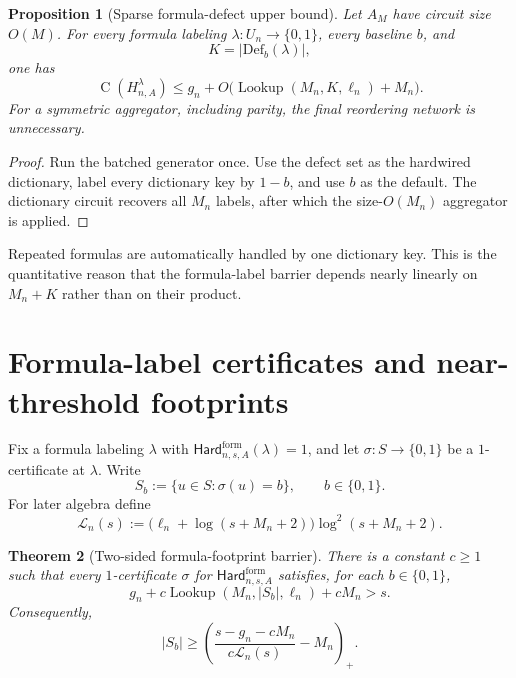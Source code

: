 \documentclass[11pt]{article}
\newtheorem{theorem}{Theorem}[section]
\newtheorem{proposition}[theorem]{Proposition}
\theoremstyle{definition}
\newcommand{\bits}{\{0,1\}}
\newcommand{\Ckt}{\operatorname{C}}
\newcommand{\Lookup}{\operatorname{Lookup}}
\newcommand{\HardF}{\mathsf{Hard}^{\mathrm{form}}}
\newcommand{\pospart}[1]{\left(#1\right)_{+}}
\begin{document}
\begin{proposition}[Sparse formula-defect upper bound]\label{prop:defect}
Let $A_M$ have circuit size $O(M)$.  For every formula labeling $\lambda:U_n\to\bits$, every baseline $b$, and
\[
  K=|\mathrm{Def}_b(\lambda)|,
\]
one has
\begin{equation}\label{eq:defect-upper}
  \Ckt(H_{n,A}^{\lambda})
  \le g_n+O\bigl(\Lookup(M_n,K,\ell_n)+M_n\bigr).
\end{equation}
For a symmetric aggregator, including parity, the final reordering network is unnecessary.
\end{proposition}

\begin{proof}
Run the batched generator once.  Use the defect set as the hardwired dictionary, label every dictionary key by $1-b$, and use $b$ as the default.  The dictionary circuit recovers all $M_n$ labels, after which the size-$O(M_n)$ aggregator is applied.
\end{proof}

Repeated formulas are automatically handled by one dictionary key.  This is the quantitative reason that the formula-label barrier depends nearly linearly on $M_n+K$ rather than on their product.

\section{Formula-label certificates and near-threshold footprints}\label{sec:formula}

Fix a formula labeling $\lambda$ with $\HardF_{n,s,A}(\lambda)=1$, and let $\sigma:S\to\bits$ be a $1$-certificate at $\lambda$.  Write
\[
  S_b:=\{u\in S:\sigma(u)=b\},
  \qquad b\in\bits.
\]
For later algebra define
\begin{equation}\label{eq:lookup-envelope}
  \mathcal L_n(s)
  :=\bigl(\ell_n+\log(s+M_n+2)\bigr)
       \log^2(s+M_n+2).
\end{equation}

\begin{theorem}[Two-sided formula-footprint barrier]\label{thm:formula-footprint}
There is a constant $c\ge1$ such that every $1$-certificate $\sigma$ for $\HardF_{n,s,A}$ satisfies, for each $b\in\bits$,
\begin{equation}\label{eq:formula-implicit}
  g_n+c\Lookup(M_n,|S_b|,\ell_n)+cM_n>s.
\end{equation}
Consequently,
\begin{equation}\label{eq:formula-explicit}
  |S_b|
  \ge
  \pospart{
    \frac{s-g_n-cM_n}{c\mathcal L_n(s)}-M_n
  }.
\end{equation}
\end{theorem}
\end{document}
